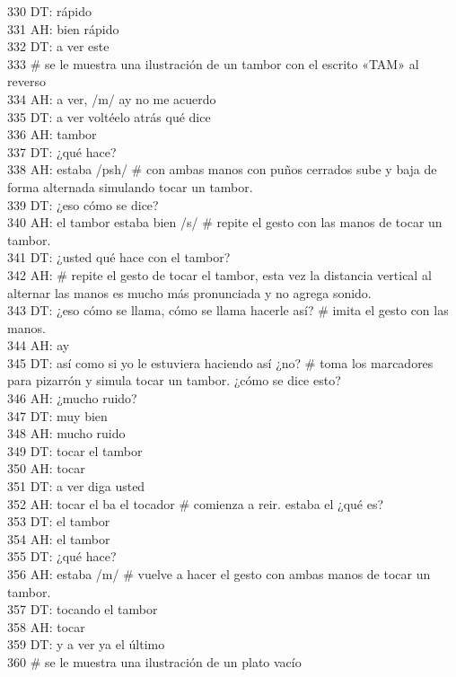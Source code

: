 330 DT: rápido\\
331 AH: bien rápido\\
332 DT: a ver este\\
333 # se le muestra una ilustración de un tambor con el escrito «TAM» al reverso\\
334 AH: a ver, /m/ ay no me acuerdo\\
335 DT: a ver voltéelo atrás qué dice\\
336 AH: tambor\\
337 DT: ¿qué hace?\\
338 AH: estaba /psh/ # con ambas manos con puños cerrados sube y baja de forma alternada simulando tocar un tambor. \\
339 DT: ¿eso cómo se dice?\\
340 AH: el tambor estaba bien /s/ # repite el gesto con las manos de tocar un tambor.\\
341 DT: ¿usted qué hace con el tambor?\\
342 AH: # repite el gesto de tocar el tambor, esta vez la distancia vertical al alternar las manos es mucho más pronunciada y no agrega sonido.\\
343 DT: ¿eso cómo se llama, cómo se llama hacerle así? # imita el gesto con las manos.\\
344 AH: ay\\
345 DT: así como si yo le estuviera haciendo así ¿no? # toma los marcadores para pizarrón y simula tocar un tambor. ¿cómo se dice esto?\\
346 AH: ¿mucho ruido?\\
347 DT: muy bien\\
348 AH: mucho ruido\\
349 DT: tocar el tambor\\
350 AH: tocar\\
351 DT: a ver diga usted\\
352 AH: tocar el ba el tocador # comienza a reir. estaba el ¿qué es?\\
353 DT: el tambor\\
354 AH: el tambor\\
355 DT: ¿qué hace?\\
356 AH: estaba /m/ # vuelve a hacer el gesto con ambas manos de tocar un tambor.\\
357 DT: tocando el tambor\\
358 AH: tocar\\
359 DT: y a ver ya el último\\
360 # se le muestra una ilustración de un plato vacío\\
